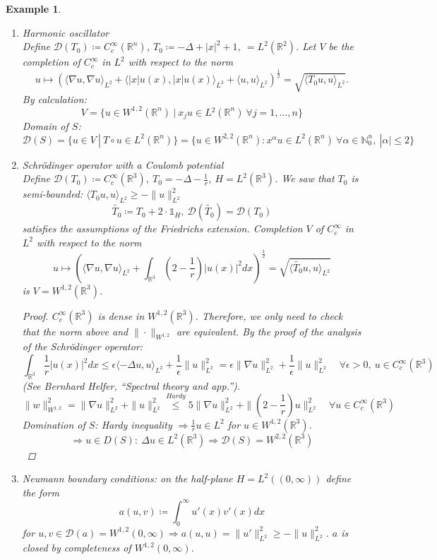 \documentclass[12pt]{extreport} %
\newcommand{\N}{\mathbb{N}}
\newcommand{\R}{\mathbb{R}}
\newcommand{\DO}[1]{\mathcal{D}\left( {#1} \right)}
\theoremstyle{named}
\theoremstyle{nnamed}
\theoremstyle{itshape}
\theoremstyle{normal}
\newtheorem*{example}{Example}
\begin{document}
\begin{example} ~\
	\begin{enumerate} 
		\item Harmonic oscillator ~\\
			Define $\DO{T_0} \coloneq C_c^\infty(\R^n)$, $T_0 \coloneqq -\Delta + |x|^2 + 1$, $ = L^2(\R^2)$. Let $V$ be the completion of $C_c^\infty$ in $L^2$ with respect to the norm
			$$ u \mapsto \left( \langle \nabla u, \nabla u \rangle_{L^2} + \langle |x|u(x), |x|u(x)\rangle_{L^2} + \langle u, u \rangle_{L^2} \right)^{\frac{1}{2}} = \sqrt{\langle T_0 u, u \rangle_{L^2}}. $$
			By calculation:
			$$ V = \big\{ u \in W^{1,2}(\R^n) ~|~x_j u \in L{^2}(\R^n) ~\forall j = 1, \dotsc, n \big\} $$
			Domain of $S$:
			$$ \DO{S} = \big\{ u \in V ~|~ T \circ u \in L^2(\R^n) \big\} = \big\{ u \in W^{2,2}(\R^n) \colon x^{\alpha} u \in L^2(\R^n) ~\forall \alpha \in \N_0^n, ~|\alpha| \leq 2 \big\} $$
		\item Schrödinger operator with a Coulomb potential ~\\
			Define $\DO{T_{0}} \coloneqq C_c^\infty(\R^3), ~ T_0 = - \Delta - \frac{1}{r}, ~ H = L^2(\R^3)$. We saw that $T_0$ is semi-bounded: $\langle T_0 u, u \rangle_{L^2} \geq - \| u \|_{L^2}^2$
			$$\tilde{T_0} \coloneqq T_0 + 2 \cdot \mathds{1}_H, ~ \DO{\tilde{T_0}} = \DO{T_0}$$ 
			satisfies the assumptions of the Friedrichs extension. Completion $V$ of $C_c^{\infty}$ in $L^2$ with respect to the norm
			$$ u \mapsto \left( \langle \nabla u, \nabla u \rangle_{L^2} + \int_{\R^3} \left( 2 - \frac{1}{r} \right) |u(x)|^2 dx \right)^\frac{1}{2} = \sqrt{ \langle \tilde{T_0} u, u \rangle_{L^2}} $$
			is $V = W^{1,2}(\R^3)$.
			
			\begin{proof}
				$C_c^\infty(\R^3)$ is dense in $W^{1,2}(\R^3)$. Therefore, we only need to check that the norm above and $\| \cdot \|_{W^{1,2}}$ are equivalent. By the proof of the analysis of the Schrödinger operator:
				$$ \int_{\R^3} \frac{1}{r} |u(x)|^2 dx \leq \epsilon \langle - \Delta u, u \rangle_{L^2} + \frac{1}{\epsilon} \| u \|_{L^2}^2 = \epsilon \| \nabla u \|_{L^2}^2 + \frac{1}{\epsilon} \| u \|^2_{L^2} \quad \forall \epsilon > 0, ~u \in C_c^\infty(\R^3) $$
				(See Bernhard Helfer, \enquote{Spectral theory and app.}).
				$$ \| w \|_{W^{1,2}}^2 = \| \nabla u \|_{L^2}^2 + \| u \|_{L^2}^2 \overset{Hardy}{\leq} 5 \| \nabla u \|^2_{L^2} + \| \left( 2 - \frac{1}{r} \right) u \|^2_{L^2} \quad \forall u \in C_c^\infty(\R^3) $$
				Domination of $S$: Hardy inequality $\Rightarrow \frac{1}{r} u \in L^2$ for $u \in W^{1,2}(\R^3)$.
				$$ \Rightarrow u \in D(S): ~ \Delta u \in L^2(\R^3) \Rightarrow \DO{S} = W^{2,2}(\R^3) $$
			\end{proof}
		\item Neumann boundary conditions: on the half-plane $H = L^2\left( (0, \infty) \right)$ define the form
			$$ a(u, v) \coloneqq \int_{0}^{\infty} u'(x) v'(x) dx  $$
			for $u,v \in \DO{a} = W^{1,2}(0, \infty) \Rightarrow a(u,u) = \|u'\|_{L^2}^2 \geq - \| u \|_{L^2}^2$. $a$ is closed by completeness of $W^{1,2}(0, \infty)$. ~\\
			

\end{enumerate}
\end{example}
\end{document}
